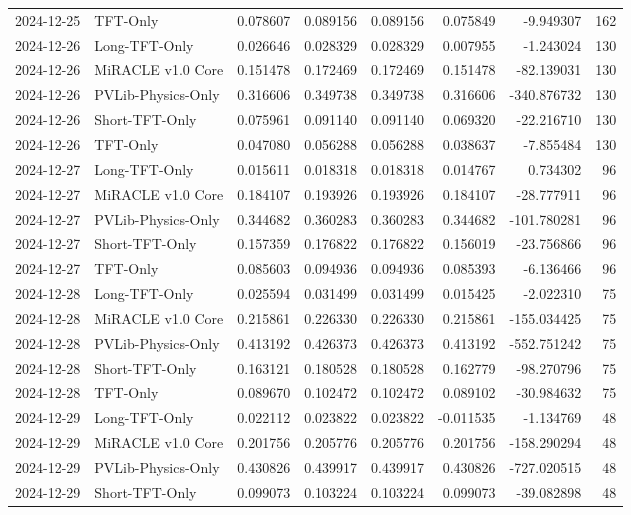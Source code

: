 \begin{tabular}{llrrrrrr}
2024-12-25 & TFT-Only & 0.078607 & 0.089156 & 0.089156 & 0.075849 & -9.949307 & 162 \\
2024-12-26 & Long-TFT-Only & 0.026646 & 0.028329 & 0.028329 & 0.007955 & -1.243024 & 130 \\
2024-12-26 & MiRACLE v1.0 Core & 0.151478 & 0.172469 & 0.172469 & 0.151478 & -82.139031 & 130 \\
2024-12-26 & PVLib-Physics-Only & 0.316606 & 0.349738 & 0.349738 & 0.316606 & -340.876732 & 130 \\
2024-12-26 & Short-TFT-Only & 0.075961 & 0.091140 & 0.091140 & 0.069320 & -22.216710 & 130 \\
2024-12-26 & TFT-Only & 0.047080 & 0.056288 & 0.056288 & 0.038637 & -7.855484 & 130 \\
2024-12-27 & Long-TFT-Only & 0.015611 & 0.018318 & 0.018318 & 0.014767 & 0.734302 & 96 \\
2024-12-27 & MiRACLE v1.0 Core & 0.184107 & 0.193926 & 0.193926 & 0.184107 & -28.777911 & 96 \\
2024-12-27 & PVLib-Physics-Only & 0.344682 & 0.360283 & 0.360283 & 0.344682 & -101.780281 & 96 \\
2024-12-27 & Short-TFT-Only & 0.157359 & 0.176822 & 0.176822 & 0.156019 & -23.756866 & 96 \\
2024-12-27 & TFT-Only & 0.085603 & 0.094936 & 0.094936 & 0.085393 & -6.136466 & 96 \\
2024-12-28 & Long-TFT-Only & 0.025594 & 0.031499 & 0.031499 & 0.015425 & -2.022310 & 75 \\
2024-12-28 & MiRACLE v1.0 Core & 0.215861 & 0.226330 & 0.226330 & 0.215861 & -155.034425 & 75 \\
2024-12-28 & PVLib-Physics-Only & 0.413192 & 0.426373 & 0.426373 & 0.413192 & -552.751242 & 75 \\
2024-12-28 & Short-TFT-Only & 0.163121 & 0.180528 & 0.180528 & 0.162779 & -98.270796 & 75 \\
2024-12-28 & TFT-Only & 0.089670 & 0.102472 & 0.102472 & 0.089102 & -30.984632 & 75 \\
2024-12-29 & Long-TFT-Only & 0.022112 & 0.023822 & 0.023822 & -0.011535 & -1.134769 & 48 \\
2024-12-29 & MiRACLE v1.0 Core & 0.201756 & 0.205776 & 0.205776 & 0.201756 & -158.290294 & 48 \\
2024-12-29 & PVLib-Physics-Only & 0.430826 & 0.439917 & 0.439917 & 0.430826 & -727.020515 & 48 \\
2024-12-29 & Short-TFT-Only & 0.099073 & 0.103224 & 0.103224 & 0.099073 & -39.082898 & 48 \\

\end{tabular}
